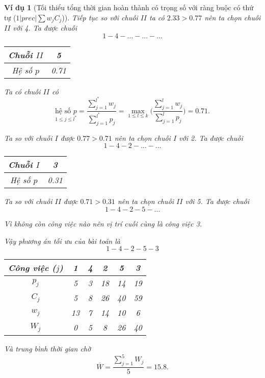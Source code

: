 \documentclass[12pt,a4paper]{report}
\newtheorem{vd}{Ví dụ}
\begin{document}
\begin{vd}[Tối thiểu tổng thời gian hoàn thành có trọng số với ràng buộc có thứ tự ($1 | prec | \sum w_j C_j$)]
Tiếp tục so với chuỗi $II$ ta có $2.33>0.77$ nên ta chọn chuỗi $II$ với 4.
Ta được chuỗi $$1-4-\ldots-\ldots-\ldots$$

\begin{table}[h!]
	\centering
	\begin{tabular}{|c | c |} 
	\hline
	Chuỗi $II$ & 5 \\
	\hline\hline
	Hệ số $p$ & 0.71 \\
	\hline
	\end{tabular}
\end{table}

Ta có chuỗi $II$ có $$
	\underset{1 \leq j \leq l^*}{\text{hệ số }p}= \frac{\sum_{j=1}^{l^*}w_j}{\sum_{j=1}^{l^*}p_j} = \underset{1 \leq l \leq k}{\max}\Biggl(\frac{\sum_{j=1}^{l}w_j}{\sum_{j=1}^{l}p_j}\Biggl)=0.71.$$

Ta so với chuỗi $I$ được $0.77>0.71$ nên ta chọn chuỗi $I$ với 2. Ta được chuỗi $$1-4-2-\ldots-\ldots$$

\begin{table}[h!]
	\centering
	\begin{tabular}{|c | c |} 
	\hline
	Chuỗi $I$ & 3 \\
	\hline\hline
	Hệ số $p$ & 0.31 \\
	\hline
	\end{tabular}
\end{table}
Ta so với chuỗi $II$ được $0.71>0.31$ nên ta chọn chuỗi $II$ với 5. Ta được chuỗi $$1-4-2-5-\ldots$$

Vì không còn công việc nào nên vị trí cuối cùng là công việc 3.

Vậy phương án tối ưu của bài toán là $$1-4-2-5-3$$

\begin{table}[h!]
	\centering
	\begin{tabular}{|c | c c c c c |} 
	\hline
	Công việc ($j$) & 1 & 4 & 2 & 5 & 3 \\
	\hline\hline
	$p_j$ & 5 & 3 & 18 & 14 & 19 \\
	$C_j$ & 5 & 8 & 26 & 40 & 59 \\
	$w_j$ & 13 & 7 & 14 & 10 & 6 \\
	$W_j$ & 0 & 5 & 8 & 26 & 40 \\
	\hline
	\end{tabular}
\end{table}

Và trung bình thời gian chờ
\begin{equation*}
\overline{W} = \frac{\sum_{j=1}^5 W_j}{5} = 15.8.
\end{equation*}

\end{vd}
\end{document}
